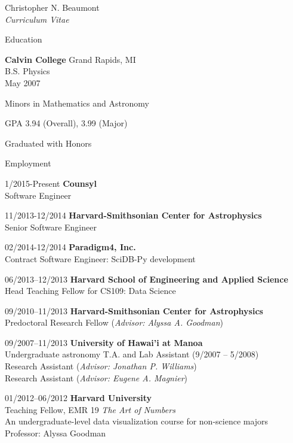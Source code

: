 \documentclass[10pt]{article}
\newenvironment{sublist}{%
	\begin{list}{}{%
		\setlength{\itemsep}{0em}\setlength{\parsep}{0em}%
		\setlength{\topsep}{0em}\setlength{\parskip}{0em}%
	}%
}%
{ \end{list} }
\begin{document}
\begin{cv}{Christopher N. Beaumont\\{\large \itshape Curriculum Vitae}}
\begin{cvlist}{Education}
	\item \textbf{Calvin College} Grand Rapids, MI\\
	B.S. Physics\\
	May 2007
	\begin{sublist}
		\item Minors in Mathematics and Astronomy
		\item GPA 3.94 (Overall), 3.99 (Major)
		\item Graduated with Honors
	\end{sublist}
\end{cvlist}

\begin{cvlist}{Employment}
	\item[1/2015-Present] \textbf{Counsyl} \\
	Software Engineer \\

	\item[11/2013-12/2014] \textbf{Harvard-Smithsonian Center for Astrophysics} \\
	Senior Software Engineer \\

	\item [02/2014-12/2014] \textbf{Paradigm4, Inc.} \\
	Contract Software Engineer: SciDB-Py development \\

	\item[06/2013--12/2013] \textbf{Harvard School of Engineering and Applied Science} \\
	Head Teaching Fellow for CS109: Data Science \\

	\item[09/2010--11/2013] \textbf{Harvard-Smithsonian Center for Astrophysics} \\
	Predoctoral Research Fellow (\emph{Advisor: Alyssa A. Goodman}) \\
	
	\item[09/2007--11/2013] \textbf{University of Hawai'i at Manoa} \\
	Undergraduate astronomy T.A. and Lab Assistant (9/2007 -- 5/2008) \\
	Research Assistant (\emph{Advisor: Jonathan P. Williams}) \\
	Research Assistant (\emph{Advisor: Eugene A. Magnier}) \\

	\item[01/2012--06/2012] \textbf{Harvard University} \\
	Teaching Fellow, EMR 19 \textit{The Art of Numbers}\\
	An undergraduate-level data visualization course for non-science majors \\
	Professor: Alyssa Goodman \\


\end{cvlist}
\end{cv}
\end{document}
